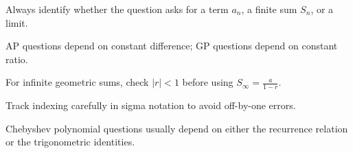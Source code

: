 \begin{takeaways}
\item Always identify whether the question asks for a term $a_n$, a finite sum $S_n$, or a limit.
\item AP questions depend on constant difference; GP questions depend on constant ratio.
\item For infinite geometric sums, check $|r|<1$ before using $S_\infty=\frac{a}{1-r}$.
\item Track indexing carefully in sigma notation to avoid off-by-one errors.
\item Chebyshev polynomial questions usually depend on either the recurrence relation or the trigonometric identities.
\end{takeaways}
